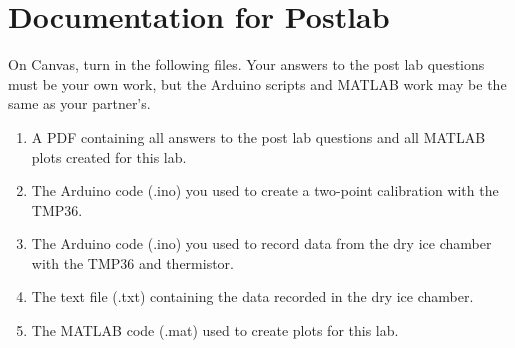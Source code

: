\documentclass[12pt]{article}
\begin{document}
    \section*{Documentation for Postlab}
    On Canvas, turn in the following files. Your answers to the post lab questions must be your own work, but the Arduino scripts and MATLAB work may be the same as your partner's.
    \begin{enumerate}
        \item A PDF containing all answers to the post lab questions and all MATLAB plots created for this lab.
        \item The Arduino code (.ino) you used to create a two-point calibration with the TMP36.
    	\item The Arduino code (.ino) you used to record data from the dry ice chamber with the TMP36 and thermistor.
    	\item The text file (.txt) containing the data recorded in the dry ice chamber.
        \item The MATLAB code (.mat) used to create plots for this lab.
    \end{enumerate}
\end{document}
